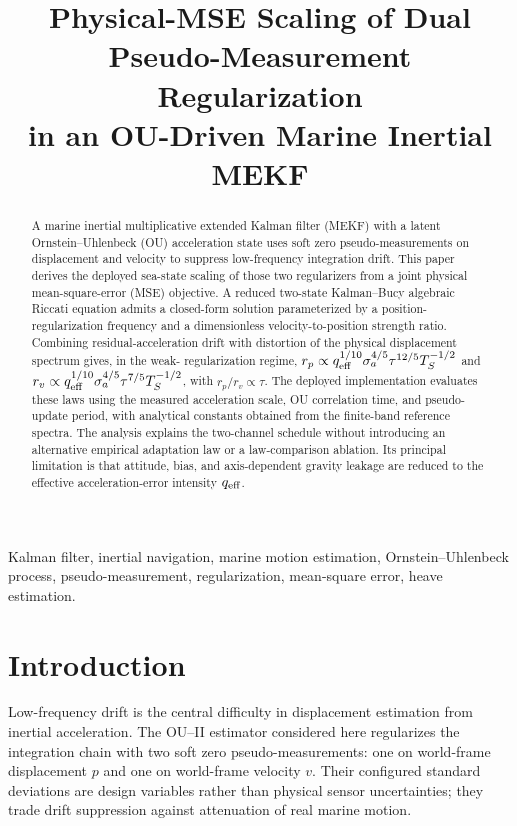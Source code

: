\documentclass[conference]{IEEEtran}
\title{Physical-MSE Scaling of Dual Pseudo-Measurement Regularization\\
in an OU-Driven Marine Inertial MEKF}
\author{\IEEEauthorblockN{Mikhail S. Grushinskiy}
\IEEEauthorblockA{Independent Researcher, USA, Fair Lawn\\
Bareboat Necessities GitHub Project\\
Email: mgrouch@users.github.com}}
\begin{document}
\maketitle

\begin{abstract}
A marine inertial multiplicative extended Kalman filter (MEKF) with a latent
Ornstein--Uhlenbeck (OU) acceleration state uses soft zero pseudo-measurements
on displacement and velocity to suppress low-frequency integration drift. This
paper derives the deployed sea-state scaling of those two regularizers from a
joint physical mean-square-error (MSE) objective. A reduced two-state
Kalman--Bucy algebraic Riccati equation admits a closed-form solution
parameterized by a position-regularization frequency and a dimensionless
velocity-to-position strength ratio. Combining residual-acceleration drift with
distortion of the physical displacement spectrum gives, in the weak-
regularization regime,
$r_p\propto q_{\rm eff}^{1/10}\sigma_a^{4/5}\tau^{12/5}T_S^{-1/2}$ and
$r_v\propto q_{\rm eff}^{1/10}\sigma_a^{4/5}\tau^{7/5}T_S^{-1/2}$, with
$r_p/r_v\propto\tau$. The deployed implementation evaluates these laws using
the measured acceleration scale, OU correlation time, and pseudo-update period,
with analytical constants obtained from the finite-band reference spectra. The
analysis explains the two-channel schedule without introducing an alternative
empirical adaptation law or a law-comparison ablation. Its principal limitation
is that attitude, bias, and axis-dependent gravity leakage are reduced to the
effective acceleration-error intensity $q_{\rm eff}$.
\end{abstract}


\begin{IEEEkeywords}
Kalman filter, inertial navigation, marine motion estimation,
Ornstein--Uhlenbeck process, pseudo-measurement, regularization, mean-square
error, heave estimation.
\end{IEEEkeywords}

\section{Introduction}

Low-frequency drift is the central difficulty in displacement estimation from
inertial acceleration. The OU--II estimator considered here regularizes the
integration chain with two soft zero pseudo-measurements: one on world-frame
displacement $p$ and one on world-frame velocity $v$. Their configured standard
deviations are design variables rather than physical sensor uncertainties; they
trade drift suppression against attenuation of real marine motion.
\end{document}
